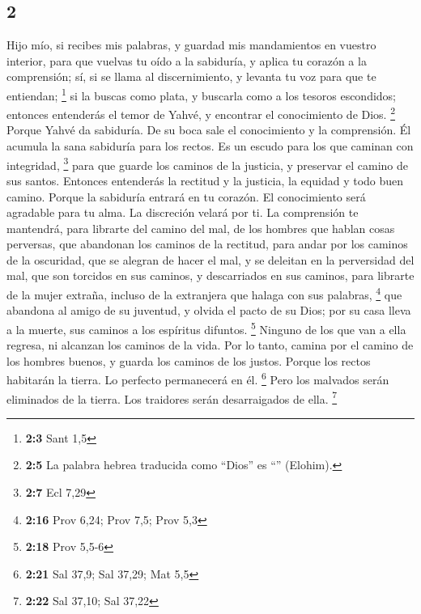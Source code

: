 \begin{paracol}{2}
\hypertarget{section-2}{%
\section{2}\label{section-2}}

 Hijo mío, si recibes mis palabras, y guardad mis
mandamientos en vuestro interior,  para que vuelvas tu
oído a la sabiduría, y aplica tu corazón a la comprensión;
 sí, si se llama al discernimiento, y levanta tu voz para
que te entiendan; \footnote{\textbf{2:3} Sant 1,5}  si la
buscas como plata, y buscarla como a los tesoros escondidos;
 entonces entenderás el temor de Yahvé, y encontrar el
conocimiento de Dios. \footnote{\textbf{2:5} La palabra hebrea traducida
  como ``Dios'' es ``'' (Elohim).}  Porque
Yahvé da sabiduría. De su boca sale el conocimiento y la comprensión.
 Él acumula la sana sabiduría para los rectos. Es un
escudo para los que caminan con integridad, \footnote{\textbf{2:7} Ecl
  7,29}  para que guarde los caminos de la justicia, y
preservar el camino de sus santos.  Entonces entenderás la
rectitud y la justicia, la equidad y todo buen camino. 
Porque la sabiduría entrará en tu corazón. El conocimiento será
agradable para tu alma.  La discreción velará por ti. La
comprensión te mantendrá,  para librarte del camino del
mal, de los hombres que hablan cosas perversas,  que
abandonan los caminos de la rectitud, para andar por los caminos de la
oscuridad,  que se alegran de hacer el mal, y se deleitan
en la perversidad del mal,  que son torcidos en sus
caminos, y descarriados en sus caminos,  para librarte de
la mujer extraña, incluso de la extranjera que halaga con sus palabras,
\footnote{\textbf{2:16} Prov 6,24; Prov 7,5; Prov 5,3} 
que abandona al amigo de su juventud, y olvida el pacto de su Dios;
 por su casa lleva a la muerte, sus caminos a los
espíritus difuntos. \footnote{\textbf{2:18} Prov 5,5-6} 
Ninguno de los que van a ella regresa, ni alcanzan los caminos de la
vida.  Por lo tanto, camina por el camino de los hombres
buenos, y guarda los caminos de los justos.  Porque los
rectos habitarán la tierra. Lo perfecto permanecerá en él. \footnote{\textbf{2:21}
  Sal 37,9; Sal 37,29; Mat 5,5}  Pero los malvados serán
eliminados de la tierra. Los traidores serán desarraigados de ella.
\footnote{\textbf{2:22} Sal 37,10; Sal 37,22}


\end{paracol}
